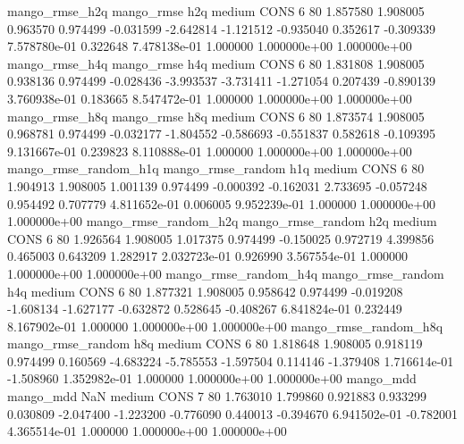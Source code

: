        mango_rmse_h2q        mango_rmse                  h2q     medium     CONS                 6 80  1.857580       1.908005 0.963570       0.974499   -0.031599     -2.642814     -1.121512    -0.935040       0.352617 -0.309339 7.578780e-01     0.322648   7.478138e-01            1.000000    1.000000e+00        1.000000e+00
       mango_rmse_h4q        mango_rmse                  h4q     medium     CONS                 6 80  1.831808       1.908005 0.938136       0.974499   -0.028436     -3.993537     -3.731411    -1.271054       0.207439 -0.890139 3.760938e-01     0.183665   8.547472e-01            1.000000    1.000000e+00        1.000000e+00
       mango_rmse_h8q        mango_rmse                  h8q     medium     CONS                 6 80  1.873574       1.908005 0.968781       0.974499   -0.032177     -1.804552     -0.586693    -0.551837       0.582618 -0.109395 9.131667e-01     0.239823   8.110888e-01            1.000000    1.000000e+00        1.000000e+00
mango_rmse_random_h1q mango_rmse_random                  h1q     medium     CONS                 6 80  1.904913       1.908005 1.001139       0.974499   -0.000392     -0.162031      2.733695    -0.057248       0.954492  0.707779 4.811652e-01     0.006005   9.952239e-01            1.000000    1.000000e+00        1.000000e+00
mango_rmse_random_h2q mango_rmse_random                  h2q     medium     CONS                 6 80  1.926564       1.908005 1.017375       0.974499   -0.150025      0.972719      4.399856     0.465003       0.643209  1.282917 2.032723e-01     0.926990   3.567554e-01            1.000000    1.000000e+00        1.000000e+00
mango_rmse_random_h4q mango_rmse_random                  h4q     medium     CONS                 6 80  1.877321       1.908005 0.958642       0.974499   -0.019208     -1.608134     -1.627177    -0.632872       0.528645 -0.408267 6.841824e-01     0.232449   8.167902e-01            1.000000    1.000000e+00        1.000000e+00
mango_rmse_random_h8q mango_rmse_random                  h8q     medium     CONS                 6 80  1.818648       1.908005 0.918119       0.974499    0.160569     -4.683224     -5.785553    -1.597504       0.114146 -1.379408 1.716614e-01    -1.508960   1.352982e-01            1.000000    1.000000e+00        1.000000e+00
            mango_mdd         mango_mdd                  NaN     medium     CONS                 7 80  1.763010       1.799860 0.921883       0.933299    0.030809     -2.047400     -1.223200    -0.776090       0.440013 -0.394670 6.941502e-01    -0.782001   4.365514e-01            1.000000    1.000000e+00        1.000000e+00

